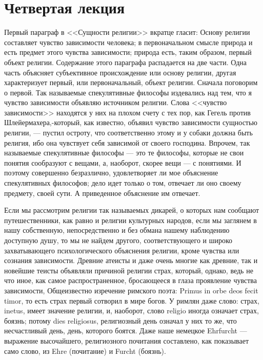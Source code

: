 \documentclass[12pt]{article}
\begin{document}
\section*{Четвертая лекция}

Первый параграф в <<Сущности религии>> вкратце гласит: Основу религии составляет чувство зависимости человека; в первоначальном смысле природа и есть предмет этого чувства зависимости; природа есть, таким образом, первый объект религии. Содержание этого параграфа распадается на две части. Одна часть объясняет субъективное происхождение или основу религии, другая характеризует первый, или первоначальный, объект религии. Сначала поговорим о первой. Так называемые спекулятивные философы издевались над тем, что я чувство зависимости объявляю источником религии. Слова <<чувство зависимости>> находятся у них на плохом счету с тех пор, как Гегель против Шлейермахера,-который, как известно, объявил чувство зависимости сущностью религии, --- пустил остроту, что соответственно этому и у собаки должна быть религия, ибо она чувствует себя зависимой от своего господина. Впрочем, так называемые спекулятивные философы --- это те философы, которые не свои понятия сообразуют с вещами, а, наоборот, скорее вещи --- с понятиями. И поэтому совершенно безразлично, удовлетворяет ли мое объяснение спекулятивных философов; дело идет только о том, отвечает ли оно своему предмету, своей сути. А приведенное объяснение им отвечает. 

Если мы рассмотрим религии так называемых дикарей, о которых нам сообщают путешественники, как равно и религии культурных народов, если мы заглянем в нашу собственную, непосредственно и без обмана нашему наблюдению доступную душу, то мы не найдем другого, соответствующего и широко захватывающего психологического объяснения религии, кроме чувства или сознания зависимости. Древние атеисты и даже очень многие как древние, так и новейшие теисты объявляли причиной религии страх, который, однако, ведь не что иное, как самое распространенное, бросающееся в глаза проявление чувства зависимости, Общеизвестно изречение римского поэта: Primus in orbe deos fecit timor, то есть страх первый сотворил в мире богов. У римлян даже слово: страх, inetus, имеет значение религии, и, наоборот, слово religio иногда означает страх, боязнь; потому dies religiosus, религиозный день означал у них то же, что несчастливый день, день, которого боятся. Даже наше немецкое Ehrfurcht --- выражение высочайшего, религиозного почитания составлено, как показывает само слово, из Ehre (почитание) и Furcht (боязнь). 
\end{document}
